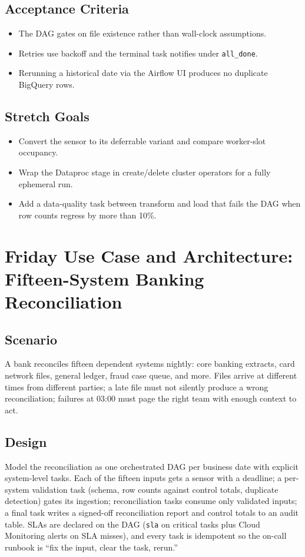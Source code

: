 \subsection*{Acceptance Criteria}
\begin{itemize}
    \item The DAG gates on file existence rather than wall-clock assumptions.
    \item Retries use backoff and the terminal task notifies under \texttt{all\_done}.
    \item Rerunning a historical date via the Airflow UI produces no duplicate BigQuery rows.
\end{itemize}

\subsection*{Stretch Goals}
\begin{itemize}
    \item Convert the sensor to its deferrable variant and compare worker-slot occupancy.
    \item Wrap the Dataproc stage in create/delete cluster operators for a fully ephemeral run.
    \item Add a data-quality task between transform and load that fails the DAG when row counts regress by more than 10\%.
\end{itemize}

\section{Friday Use Case and Architecture: Fifteen-System Banking Reconciliation}

\subsection{Scenario}
A bank reconciles fifteen dependent systems nightly: core banking extracts, card network files, general ledger, fraud case queue, and more. Files arrive at different times from different parties; a late file must not silently produce a wrong reconciliation; failures at 03:00 must page the right team with enough context to act.

\subsection{Design}
Model the reconciliation as one orchestrated DAG per business date with explicit system-level tasks. Each of the fifteen inputs gets a sensor with a deadline; a per-system validation task (schema, row counts against control totals, duplicate detection) gates its ingestion; reconciliation tasks consume only validated inputs; a final task writes a signed-off reconciliation report and control totals to an audit table. SLAs are declared on the DAG (\texttt{sla} on critical tasks plus Cloud Monitoring alerts on SLA misses), and every task is idempotent so the on-call runbook is ``fix the input, clear the task, rerun.''

